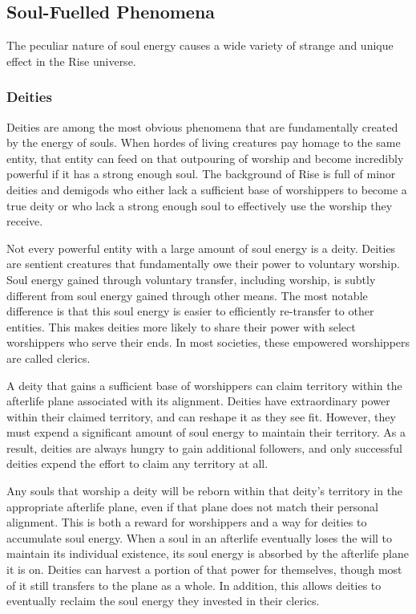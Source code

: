     \subsection{Soul-Fuelled Phenomena}

        The peculiar nature of soul energy causes a wide variety of strange and unique effect in the Rise universe.

        \subsubsection{Deities}
            Deities are among the most obvious phenomena that are fundamentally created by the energy of souls.
            When hordes of living creatures pay homage to the same entity, that entity can feed on that outpouring of worship and become incredibly powerful if it has a strong enough soul.
            The background of Rise is full of minor deities and demigods who either lack a sufficient base of worshippers to become a true deity or who lack a strong enough soul to effectively use the worship they receive.

            Not every powerful entity with a large amount of soul energy is a deity.
            Deities are sentient creatures that fundamentally owe their power to voluntary worship.
            Soul energy gained through voluntary transfer, including worship, is subtly different from soul energy gained through other means.
            The most notable difference is that this soul energy is easier to efficiently re-transfer to other entities.
            This makes deities more likely to share their power with select worshippers who serve their ends.
            In most societies, these empowered worshippers are called clerics.

            A deity that gains a sufficient base of worshippers can claim territory within the afterlife plane associated with its alignment.
            Deities have extraordinary power within their claimed territory, and can reshape it as they see fit.
            However, they must expend a significant amount of soul energy to maintain their territory.
            As a result, deities are always hungry to gain additional followers, and only successful deities expend the effort to claim any territory at all.

            Any souls that worship a deity will be reborn within that deity's territory in the appropriate afterlife plane, even if that plane does not match their personal alignment.
            This is both a reward for worshippers and a way for deities to accumulate soul energy.
            When a soul in an afterlife eventually loses the will to maintain its individual existence, its soul energy is absorbed by the afterlife plane it is on.
            Deities can harvest a portion of that power for themselves, though most of it still transfers to the plane as a whole.
            In addition, this allows deities to eventually reclaim the soul energy they invested in their clerics.

